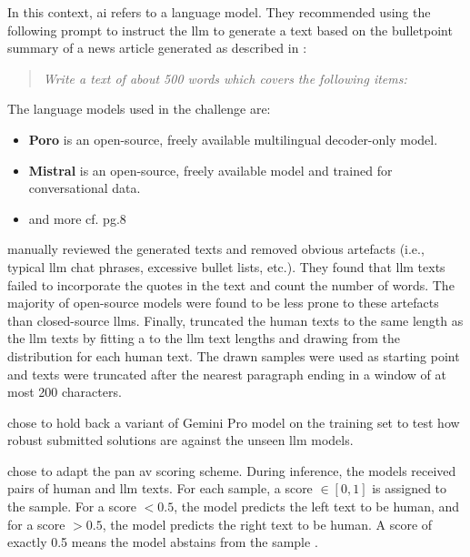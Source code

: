 In this context, \ac{ai} refers to a language model.
They recommended using the following prompt to instruct the \ac{llm} to generate a text 
based on the bulletpoint summary of a news article generated as described in \citep{bevendorff_overview_2024}:
\begin{quote}
    \textit{Write a text of about 500 words which covers the following items:}
\end{quote}
The language models used in the challenge are:
\begin{itemize}
    \item \textbf{Poro} is an open-source, freely available multilingual decoder-only model.
    \item \textbf{Mistral} is an open-source, freely available model and trained for conversational data.
    \item and more cf. pg.8 \citep{bevendorff_overview_2024}
\end{itemize}
\citet{bevendorff_overview_2024} manually reviewed the generated texts and removed obvious artefacts 
(i.e., typical \ac{llm} chat phrases, excessive bullet lists, etc.).
They found that \ac{llm} texts failed to incorporate the quotes in the text and count the number of words.
The majority of open-source models were found to be less prone to these artefacts than closed-source \acp{llm}.
Finally, \citet{bevendorff_overview_2024} truncated the human texts to the same length as the \ac{llm} texts by 
fitting a  to the \ac{llm} text lengths and drawing from the distribution for each human text.
The drawn samples were used as starting point and texts were truncated after the nearest paragraph ending in a window of at most 200 characters.

\citet{bevendorff_overview_2024} chose to hold back a variant of Gemini Pro model on the training set to test 
how robust submitted solutions are against the unseen \ac{llm} models.

\citet{bevendorff_overview_2024} chose to adapt the \ac{pan} \ac{av} scoring scheme.
During inference, the models received pairs of human and \ac{llm} texts.
For each sample, a score $\in [0, 1]$ is assigned to the sample.
For a score $<0.5$, the model predicts the left text to be human,
and for a score $>0.5$, the model predicts the right text to be human.
A score of exactly 0.5 means the model abstains from the sample \citep{bevendorff_overview_2024,kocher_unine_2015}.

